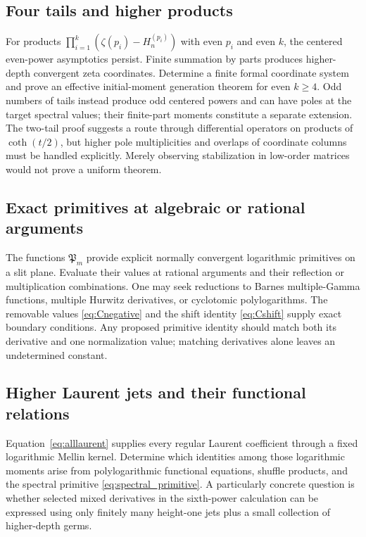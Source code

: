 \subsection{Four tails and higher products}

For products $\prod_{i=1}^k(\zeta(p_i)-H_n^{(p_i)})$ with even
$p_i$ and even $k$, the centered even-power asymptotics persist.
Finite summation by
parts produces higher-depth convergent zeta coordinates. Determine a
finite formal coordinate system and prove an effective initial-moment
generation theorem for even $k\ge4$. Odd numbers of tails instead
produce odd centered powers and can have poles at the target spectral
values; their finite-part moments constitute a separate extension.
The two-tail proof suggests a route
through differential operators on products of $\coth(t/2)$, but
higher pole multiplicities and overlaps of coordinate columns must
be handled explicitly. Merely observing stabilization in low-order
matrices would not prove a uniform theorem.

\subsection{Exact primitives at algebraic or rational arguments}

The functions $\mathfrak P_m$ provide explicit normally convergent
logarithmic primitives on a slit plane. Evaluate their values at
rational arguments and their reflection or multiplication combinations.
One may seek reductions to Barnes multiple-Gamma functions, multiple
Hurwitz derivatives, or cyclotomic polylogarithms. The removable values
\eqref{eq:Cnegative} and the shift identity \eqref{eq:Cshift} supply
exact boundary conditions. Any proposed primitive identity should
match both its derivative and one normalization value; matching
derivatives alone leaves an undetermined constant.

\subsection{Higher Laurent jets and their functional relations}

Equation~\eqref{eq:alllaurent} supplies every regular Laurent
coefficient through a fixed logarithmic Mellin kernel. Determine
which identities among those logarithmic moments arise from
polylogarithmic functional equations, shuffle products, and the
spectral primitive \eqref{eq:spectral_primitive}. A particularly
concrete question is whether selected mixed derivatives in the
sixth-power calculation can be expressed using only finitely many
height-one jets plus a small collection of higher-depth germs.

